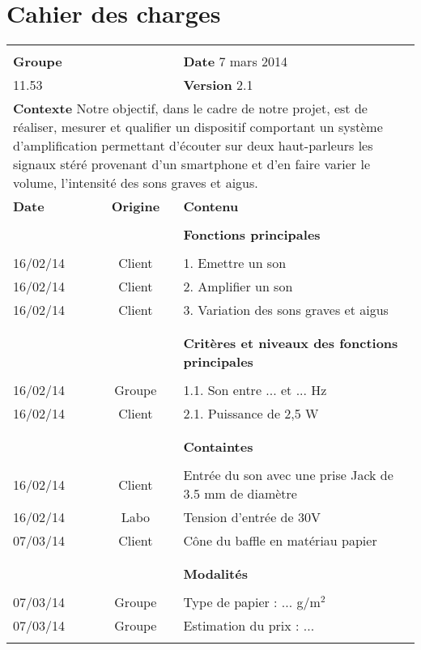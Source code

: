 

\section{Cahier des charges}

\begin{table*} [h]

\begin{tabular}{|l|c|l|}

\hline
&&\\
\textbf{Groupe} & & \hfill \textbf{Date} 7 mars 2014\\
11.53 && \hfill \textbf{Version} 2.1\\

\hline
\multicolumn{3}{|p{15cm}|}{\textbf{Contexte} \newline
Notre objectif, dans le cadre de notre projet, est de réaliser, mesurer et qualifier un dispositif comportant un système d'amplification permettant  d'écouter sur deux haut-parleurs les signaux stéré provenant d'un smartphone et d'en faire varier le volume, l'intensité des sons graves et aigus.}  \\


\hline
\textbf{Date} & \textbf{Origine} & \textbf{Contenu}\\
\hline
&&\\
&&\textbf{Fonctions principales}\\
&&\\
16/02/14 & Client & 1. Emettre un son \\
16/02/14 & Client & 2. Amplifier un son \\
16/02/14 & Client & 3. Variation des sons graves et aigus \\
&&\\
\hline
&&\\
& & \textbf{Critères et niveaux des fonctions principales} \\
&&\\
16/02/14 & Groupe & 1.1. Son entre ... et ... Hz \\
16/02/14 & Client & 2.1. Puissance de 2,5 W \\
&&\\
\hline
&&\\
& & \textbf{Containtes} \\
&&\\
16/02/14 & Client &  Entrée du son avec une prise Jack de 3.5 mm de diamètre \\
16/02/14 & Labo &  Tension d'entrée de 30V \\
07/03/14 & Client &  Cône du baffle en matériau papier \\
&&\\
\hline
&&\\
& & \textbf{Modalités} \\
&&\\
07/03/14 & Groupe & Type de papier : ... g/m$^{2}$ \\
07/03/14 & Groupe & Estimation du prix : ...\\

&&\\
\hline
\end{tabular}

\end{table*}


